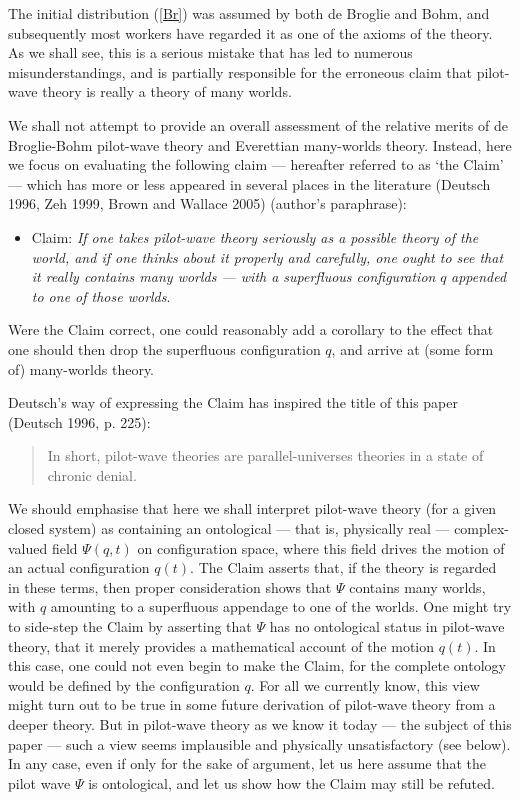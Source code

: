 \documentclass{article}%
\begin{document}
The initial distribution (\ref{Br}) was assumed by both de Broglie and Bohm,
and subsequently most workers have regarded it as one of the axioms of the
theory. As we shall see, this is a serious mistake that has led to numerous
misunderstandings, and is partially responsible for the erroneous claim that
pilot-wave theory is really a theory of many worlds.

We shall not attempt to provide an overall assessment of the relative merits
of de Broglie-Bohm pilot-wave theory and Everettian many-worlds theory.
Instead, here we focus on evaluating the following claim --- hereafter
referred to as `the Claim' --- which has more or less appeared in several
places in the literature (Deutsch 1996, Zeh 1999, Brown and Wallace 2005)
(author's paraphrase):

\begin{itemize}
\item Claim: \textit{If one takes pilot-wave theory seriously as a possible
theory of the world, and if one thinks about it properly and carefully, one
ought to see that it really contains many worlds --- with a superfluous
configuration }$q$\textit{ appended to one of those worlds}.
\end{itemize}
Were the Claim correct, one could reasonably add a corollary to the
effect that one should then drop the superfluous configuration $q$, and arrive
at (some form of) many-worlds theory.

Deutsch's way of expressing the Claim has inspired the title of this paper
(Deutsch 1996, p. 225):

\begin{quote}
In short, pilot-wave theories are parallel-universes theories in a state of
chronic denial.
\end{quote}

We should emphasise that here we shall interpret pilot-wave theory (for a
given closed system) as containing an ontological --- that is, physically real
--- complex-valued field $\Psi(q,t)$ on configuration space, where this field
drives the motion of an actual configuration $q(t)$. The Claim asserts that,
if the theory is regarded in these terms, then proper consideration shows that
$\Psi$ contains many worlds, with $q$ amounting to a superfluous appendage to
one of the worlds. One might try to side-step the Claim by asserting that
$\Psi$ has no ontological status in pilot-wave theory, that it merely provides
a mathematical account of the motion $q(t)$. In this case, one could not even
begin to make the Claim, for the complete ontology would be defined by the
configuration $q$. For all we currently know, this view might turn out to be
true in some future derivation of pilot-wave theory from a deeper theory. But
in pilot-wave theory as we know it today --- the subject of this paper ---
such a view seems implausible and physically unsatisfactory (see below). In
any case, even if only for the sake of argument, let us here assume that the
pilot wave $\Psi$ is ontological, and let us show how the Claim may still be refuted.
\end{document}
